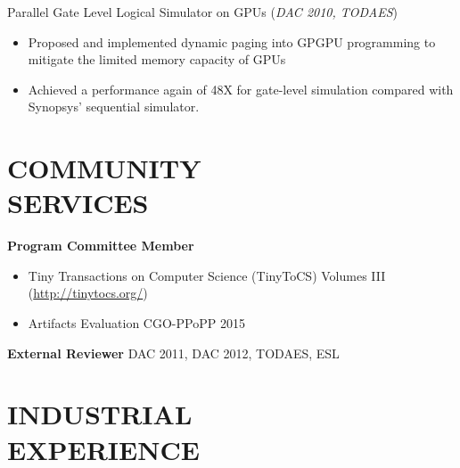 \documentclass[margin, 9pt]{res} %
\begin{document}
\begin{resume}
\medskip
Parallel Gate Level Logical Simulator on GPUs \hfill(\textit{DAC 2010, TODAES})\\
\vspace*{-10pt}
\begin{itemize}[leftmargin=*] \itemsep -3pt
\vspace*{-5pt}
	\item Proposed and implemented dynamic paging into GPGPU programming to mitigate the limited memory capacity of GPUs
	\item Achieved a performance again of 48X for gate-level simulation compared with Synopsys' sequential simulator.
\end{itemize}


\section{COMMUNITY\\ SERVICES}

\textbf{Program Committee Member}\\
\vspace*{-10pt}
\begin{itemize}[leftmargin=*] \itemsep -3pt
\vspace*{-5pt}
	\item Tiny Transactions on Computer Science (TinyToCS) Volumes III (\url{http://tinytocs.org/})\par
	\item Artifacts Evaluation CGO-PPoPP 2015\par
\end{itemize}
\textbf{External Reviewer} DAC 2011, DAC 2012, TODAES, ESL



\section{INDUSTRIAL\\ EXPERIENCE} 


\end{resume}
\end{document}
